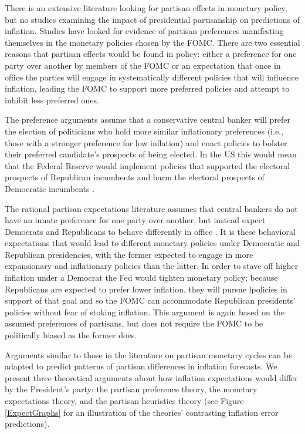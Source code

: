 \documentclass[a4paper]{article}\usepackage{graphicx, color}
\begin{document}
There is an extensive literature looking for partisan effects in monetary policy, but no studies examining the impact of presidential partisanship on predictions of inflation. Studies have looked for evidence of partisan preferences manifesting themselves in the monetary policies chosen by the FOMC. There are two essential reasons that partisan effects would be found in policy: either a preference for one party over another by members of the FOMC or an expectation that once in office the parties will engage in systematically different policies that will influence inflation, leading the FOMC to support more preferred policies and attempt to inhibit less preferred ones. 

The preference arguments assume that a conservative central banker will prefer the election of politicians who hold more similar inflationary preferences (i.e., those with a stronger preference for low inflation) and enact policies to bolster their preferred candidate's prospects of being elected. In the US this would mean that the Federal Reserve would implement policies that supported the electoral prospects of Republican incumbents and harm the electoral prospects of Democratic incumbents \citep{Clark2012,Hakes1988,Sieg1997,Tootell1996}.

The rational partisan expectations literature assumes that central bankers do not have an innate preference for one party over another, but instead expect Democrats and Republicans to behave differently in office \citep{Alesina1991,Hibbs1994}. It is these behavioral expectations that would lead to different monetary policies under Democratic and Republican presidencies, with the former expected to engage in more expansionary and inflationary policies than the latter. In order to stave off higher inflation under a Democrat the Fed would tighten monetary policy; because Republicans are expected to prefer lower inflation, they will pursue lpolicies in support of that goal and so the FOMC can accommodate Republican presidents' policies without fear of stoking inflation. This argument is again based on the assumed preferences of partisans, but does not require the FOMC to be politically biased as the former does. 

Arguments similar to those in the literature on partisan monetary cycles can be adapted to predict patterns of partisan differences in inflation forecasts. We present three theoretical arguments about how inflation expectations would differ by the President's party: the partisan preference theory, the monetary expectations theory, and the partisan heuristics theory (see Figure \ref{ExpectGraphs} for an illustration of the theories' contrasting inflation error predictions).
\end{document}
